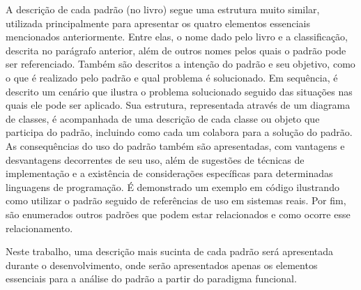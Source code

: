 A descrição de cada padrão (no livro) segue uma estrutura 
muito similar, utilizada principalmente para apresentar 
os quatro elementos essenciais mencionados anteriormente. 
Entre elas, o nome dado pelo livro e a classificação, 
descrita no parágrafo anterior, além de 
outros nomes pelos quais o padrão pode ser referenciado. 
Também são descritos a intenção do padrão e seu objetivo, 
como o que é realizado pelo padrão e qual problema é 
solucionado. Em sequência, é descrito um cenário que 
ilustra o problema solucionado seguido das 
situações nas quais ele pode ser aplicado. Sua estrutura, 
representada através de um diagrama de classes, é 
acompanhada de uma descrição de cada classe ou objeto 
que participa do padrão, incluindo como cada um 
colabora para a solução do padrão. As consequências do 
uso do padrão também são apresentadas, com vantagens e 
desvantagens decorrentes de seu uso, além de sugestões de 
técnicas de implementação e a existência de considerações 
específicas para determinadas linguagens de programação. 
É demonstrado um exemplo 
em código ilustrando como utilizar o padrão seguido de 
referências de uso em sistemas reais. Por fim, são 
enumerados outros padrões que podem estar relacionados 
e como ocorre esse relacionamento.

Neste trabalho, uma descrição mais sucinta de cada 
padrão será apresentada durante o desenvolvimento, onde 
serão apresentados apenas os elementos essenciais para 
a análise do padrão a partir do paradigma funcional.